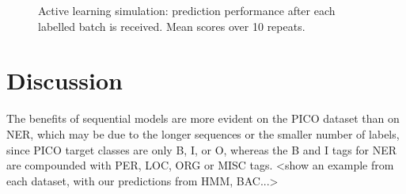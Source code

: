 \begin{figure}
\centering
{}
\caption{Active learning simulation: prediction performance after each labelled batch is received. Mean scores over 10 repeats.}
\label{fig:al}
\end{figure}

\section{Discussion}

The benefits of sequential models are more evident on the PICO dataset than on NER, which may be due to the longer sequences or the smaller number of labels, since PICO target classes are only B, I, or O, whereas the B and I tags for NER 
are compounded with PER, LOC, ORG or MISC tags. <show an example from each dataset, with our predictions from HMM, BAC...>
